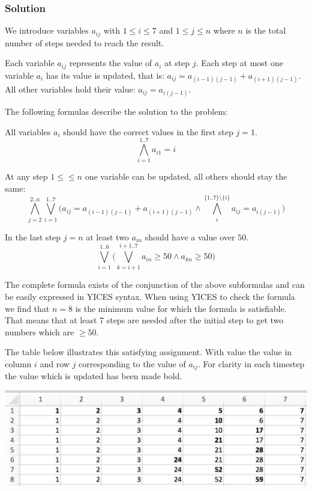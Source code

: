 \documentclass[12pt]{article}
\begin{document}
\subsubsection{Solution}
We introduce variables $a_{ij}$ with $1\leq i \leq 7$ and $1 \leq j \leq n$ 
where $n$ is the total number of steps needed to reach the result.

Each
variable $a_{ij}$ represents the value of $a_i$ at step $j$. Each step at
most one variable $a_i$ has its value is updated, that is: 
$a_{ij} = a_{(i-1)(j-1)}+ a_{(i+1)(j-1)}$. All other variables hold their value:
$a_{ij} = a_{i(j-1)}$.

The following formulas describe the solution to the problem:

\vspace{3mm}

All variables $a_i$ should have the correct values in the first step $j=1$.
\begin{equation}
	\bigwedge_{i=1}^{1..7} a_{i1} = i
\end{equation}

\vspace{3mm}

At any step $1 \le \leq n$ one variable can be updated, all others should stay
the same:
\begin{equation}
	\bigwedge_{j=2}^{2..n} \bigvee_{i=1}^{1..7} 
		\Big(a_{ij} = a_{(i-1)(j-1)} + a_{(i+1)(j-1)} \wedge
		\bigwedge_i^{\{1..7\}\setminus \{i\}} a_{ij} = a_{i(j-1)} \Big)
\end{equation}

In the last step $j=n$ at least two $a_{in}$ should have a value over $50$. 
\begin{equation}
	\bigvee_{i=1}^{1..6} \Big( \bigvee_{k=i+1}^{i+1..7} 
		a_{in} \geq 50 \wedge a_{kn} \geq 50 \Big)
\end{equation}

The complete formula exists of the conjunction of the above subformulas and can 
be easily expressed in YICES syntax. When using YICES to check the formula
we find that $n=8$ is the minimum value for which the formula is satisfiable.
That means that at least 7 steps are needed after the initial step to get two
numbers which are $\geq 50$.

The table below illustrates this satisfying assignment. With value the value in
column $i$ and row $j$ corresponding to the value of $a_{ij}$. For clarity in
each timestep the value which is updated has been made bold.

\vspace{3mm}

\includegraphics[width=\textwidth]{four.png}
\end{document}
